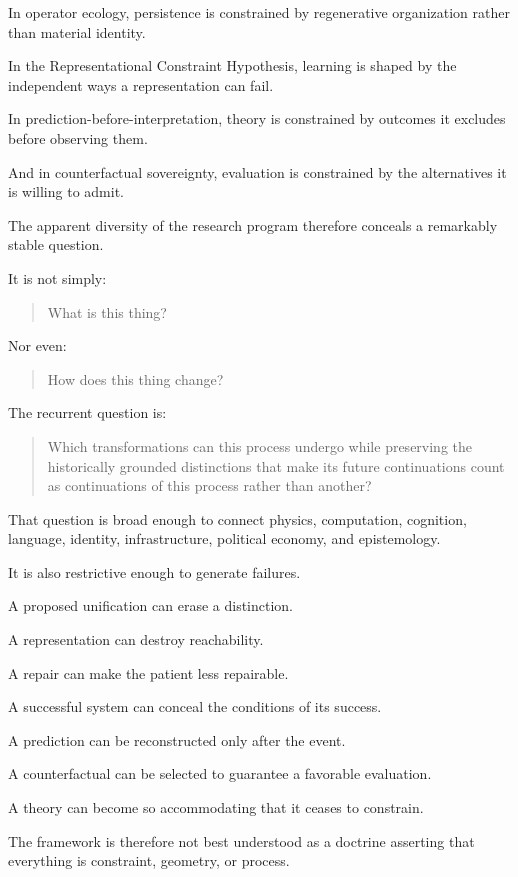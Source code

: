 \documentclass[11pt]{article}
\theoremstyle{remark}
\begin{document}
In operator ecology, persistence is constrained by regenerative organization rather than material identity.

In the Representational Constraint Hypothesis, learning is shaped by the independent ways a representation can fail.

In prediction-before-interpretation, theory is constrained by outcomes it excludes before observing them.

And in counterfactual sovereignty, evaluation is constrained by the alternatives it is willing to admit.

The apparent diversity of the research program therefore conceals a remarkably stable question.

It is not simply:

\begin{quote}
What is this thing?
\end{quote}

Nor even:

\begin{quote}
How does this thing change?
\end{quote}

The recurrent question is:

\begin{quote}
Which transformations can this process undergo while preserving the historically grounded distinctions that make its future continuations count as continuations of this process rather than another?
\end{quote}

That question is broad enough to connect physics, computation, cognition, language, identity, infrastructure, political economy, and epistemology.

It is also restrictive enough to generate failures.

A proposed unification can erase a distinction.

A representation can destroy reachability.

A repair can make the patient less repairable.

A successful system can conceal the conditions of its success.

A prediction can be reconstructed only after the event.

A counterfactual can be selected to guarantee a favorable evaluation.

A theory can become so accommodating that it ceases to constrain.

The framework is therefore not best understood as a doctrine asserting that everything is constraint, geometry, or process.
\end{document}
